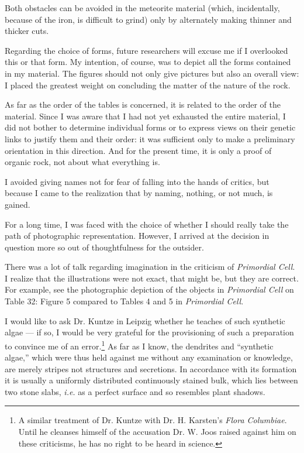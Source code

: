 \documentclass[a4paper, 12pt, oneside]{article}
\begin{document}
Both obstacles can be avoided in the meteorite material (which, incidentally, because of the iron, is difficult to grind) only by alternately making thinner and thicker cuts.

Regarding the choice of forms, future researchers will excuse me if I overlooked this or that form. My intention, of course, was to depict all the forms contained in my material. The figures should not only give pictures but also an overall view: I placed the greatest weight on concluding the matter of the nature of the rock.

As far as the order of the tables is concerned, it is related to the order of the material. Since I was aware that I had not yet exhausted the entire material, I did not bother to determine individual forms or to express views on their genetic links to justify them and their order: it was sufficient only to make a preliminary orientation in this direction. And for the present time, it is only a proof of organic rock, not about what everything is.

I avoided giving names not for fear of falling into the hands of critics, but because I came to the realization that by naming, nothing, or not much, is gained.

For a long time, I was faced with the choice of whether I should really take the path of photographic representation. However, I arrived at the decision in question more so out of thoughtfulness for the outsider.

There was a lot of talk regarding imagination in the criticism of \emph{Primordial Cell}. I realize that the illustrations were not exact, that might be, but they are correct. For example, see the photographic depiction of the objects in \emph{Primordial Cell} on Table 32: Figure 5 compared to Tables 4 and 5 in \emph{Primordial Cell}.

I would like to ask Dr. Kuntze in Leipzig whether he teaches of such synthetic algae --- if so, I would be very grateful for the provisioning of such a preparation to convince me of an error.\footnote{A similar treatment of Dr. Kuntze with Dr. H. Karsten's \emph{Flora Columbiae}. Until he cleanses himself of the accusation Dr. W. Joos raised against him on these criticisms, he has no right to be heard in science.} As far as I know, the dendrites and ``synthetic algae,'' which were thus held against me without any examination or knowledge, are merely stripes not structures and secretions. In accordance with its formation it is usually a uniformly distributed continuously stained bulk, which lies between two stone slabs, \emph{i.e.} as a perfect surface and so resembles plant shadows.
\end{document}

